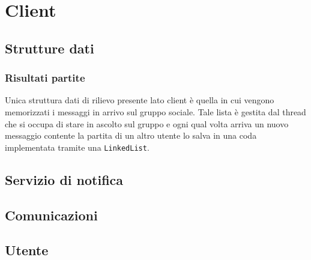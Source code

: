 \section{Client}
\subsection{Strutture dati}
\subsubsection{Risultati partite}
Unica struttura dati di rilievo presente lato client è quella in cui vengono memorizzati i
messaggi in arrivo sul gruppo sociale. Tale lista è gestita dal thread che si occupa di stare in
ascolto sul gruppo e ogni qual volta arriva un nuovo messaggio contente la partita di un altro
utente lo salva in una coda implementata tramite una \verb|LinkedList|.
\subsection{Servizio di notifica}
\subsection{Comunicazioni}
\subsection{Utente}